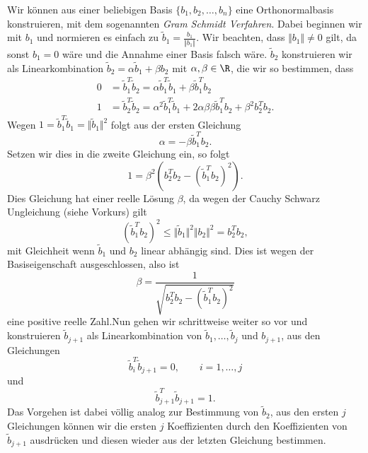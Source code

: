 \documentclass[letterpaper,10pt,english]{jupyterBook}
\begin{document}
Wir können aus einer beliebigen Basis \(\{b_1,b_2, \ldots,b_n\}\) eine Orthonormalbasis konstruieren, mit dem sogenannten \emph{Gram Schmidt Verfahren}. Dabei beginnen wir mit \(b_1\) und normieren es einfach zu \(\tilde b_1 = \frac{b_1}{\Vert b_1\Vert}\). Wir beachten, dass \(\Vert b_1\Vert \neq 0\) gilt, da sonst \(b_1=0\) wäre und die Annahme einer Basis falsch wäre. \(\tilde b_2\) konstruieren wir als Linearkombination \(\tilde b_2 = \alpha \tilde b_1 + \beta b_2\) mit \(\alpha, \beta \in \R\), die wir so bestimmen, dass
\begin{align*}
0 &=  \tilde b_1^T \tilde b_2 = \alpha \tilde b_1^T \tilde b_1 + \beta \tilde b_1^T b_2\\
1 &=  \tilde b_2^T \tilde b_2 = \alpha^2 \tilde b_1^T \tilde b_1 + 2 \alpha \beta \beta \tilde b_1^T b_2 + \beta^2 b_2^T b_2.
\end{align*}
Wegen \(1 = \tilde b_1^T \tilde b_1 = \Vert \tilde b_1 \Vert^2\) folgt aus der ersten Gleichung
\begin{equation*}
 \alpha = - \beta \tilde b_1^T b_2.
\end{equation*}
Setzen wir dies in die zweite Gleichung ein, so folgt
\begin{equation*}
 1 = \beta^2 ( b_2^T b_2 - (\tilde b_1^T b_2)^2).
\end{equation*}
Dies Gleichung hat einer reelle Lösung \(\beta\), da wegen der Cauchy Schwarz Ungleichung (siehe Vorkurs) gilt
\begin{equation*}
 (\tilde b_1^T b_2)^2 \leq \Vert \tilde b_1 \Vert^2 \Vert b_2 \Vert^2 =  b_2^T b_2 ,
\end{equation*}
mit Gleichheit wenn \(\tilde b_1\) und \(b_2\) linear abhängig sind. Dies ist wegen der Basiseigenschaft ausgeschlossen, also ist
\begin{equation*}
 \beta = \frac{1}{\sqrt{b_2^T b_2 - (\tilde b_1^T b_2)^2}}\end{equation*}
eine positive reelle Zahl.Nun gehen wir schrittweise weiter so vor und konstruieren \(\tilde b_{j+1}\) als Linearkombination von \(\tilde b_1, \ldots, \tilde b_j\) und \(b_{j+1}\), aus den Gleichungen
\begin{equation*}
 \tilde b_i^T \tilde b_{j+1} = 0, \qquad i=1,\ldots,j
\end{equation*}
und
\begin{equation*}
 \tilde b_{j+1}^T \tilde b_{j+1} = 1.
\end{equation*}
Das Vorgehen ist dabei völlig analog zur Bestimmung von \(\tilde b_2\), aus den ersten \(j\) Gleichungen können wir die ersten \(j\) Koeffizienten durch den Koeffizienten von \(\tilde b_{j+1}\) ausdrücken und diesen wieder aus der letzten Gleichung bestimmen.
\end{document}
